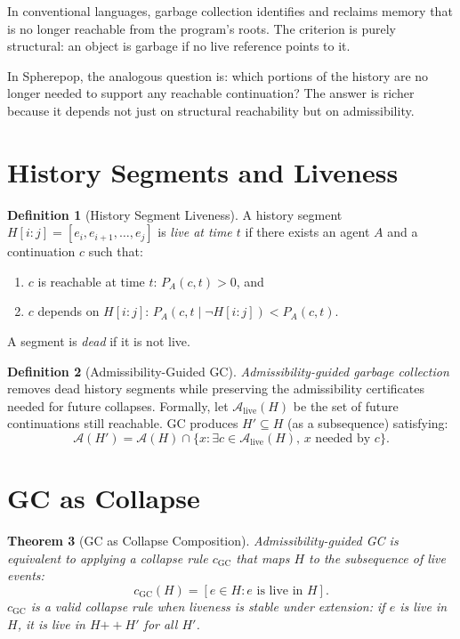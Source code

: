 \documentclass[12pt, a4paper, openany]{book}
\theoremstyle{plain}
\newtheorem{theorem}{Theorem}[chapter]
\theoremstyle{definition}
\newtheorem{definition}[theorem]{Definition}
\theoremstyle{remark}
\newcommand{\calA}{\mathcal{A}}
\begin{document}
In conventional languages, garbage collection identifies and reclaims memory that
is no longer reachable from the program's roots. The criterion is purely
structural: an object is garbage if no live reference points to it.

In Spherepop, the analogous question is: which portions of the history are no
longer needed to support any reachable continuation? The answer is richer because
it depends not just on structural reachability but on admissibility.

\section{History Segments and Liveness}

\begin{definition}[History Segment Liveness]
A history segment $H[i:j] = [e_i, e_{i+1}, \ldots, e_j]$ is \emph{live at
time $t$} if there exists an agent $A$ and a continuation $c$ such that:
\begin{enumerate}
\item $c$ is reachable at time $t$: $P_A(c, t) > 0$, and
\item $c$ depends on $H[i:j]$: $P_A(c, t \mid \neg H[i:j]) < P_A(c, t)$.
\end{enumerate}
A segment is \emph{dead} if it is not live.
\end{definition}

\begin{definition}[Admissibility-Guided GC]
\emph{Admissibility-guided garbage collection} removes dead history segments
while preserving the admissibility certificates needed for future collapses.
Formally, let $\calA_{\mathrm{live}}(H)$ be the set of future continuations
still reachable. GC produces $H' \subseteq H$ (as a subsequence) satisfying:
\[
\calA(H') = \calA(H) \cap \{x : \exists c \in \calA_{\mathrm{live}}(H),\, x \text{ needed by } c\}.
\]
\end{definition}

\section{GC as Collapse}

\begin{theorem}[GC as Collapse Composition]
Admissibility-guided GC is equivalent to applying a collapse rule $c_{\mathrm{GC}}$
that maps $H$ to the subsequence of live events:
\[
c_{\mathrm{GC}}(H) = [e \in H : e \text{ is live in } H].
\]
$c_{\mathrm{GC}}$ is a valid collapse rule when liveness is stable under
extension: if $e$ is live in $H$, it is live in $H \mathbin{++} H'$ for all $H'$.
\end{theorem}
\end{document}
